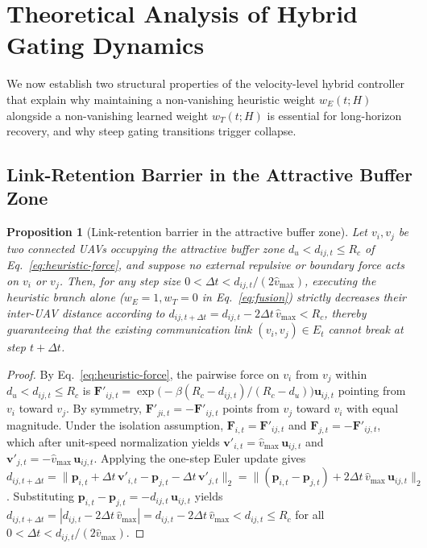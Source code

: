\documentclass[11pt]{article}
\theoremstyle{plain}
\newtheorem{proposition}{Proposition}
\theoremstyle{definition}
\theoremstyle{remark}
\begin{document}
\section{Theoretical Analysis of Hybrid Gating Dynamics}
\label{sec:theory}

We now establish two structural properties of the velocity-level hybrid controller that explain why maintaining a non-vanishing heuristic weight $w_E(t; H)$ alongside a non-vanishing learned weight $w_T(t; H)$ is essential for long-horizon recovery, and why steep gating transitions trigger collapse.

\subsection{Link-Retention Barrier in the Attractive Buffer Zone}
\label{sec:monotonicity}

\begin{proposition}[Link-retention barrier in the attractive buffer zone]
\label{prop:monotonicity}
Let $v_i, v_j$ be two connected UAVs occupying the attractive buffer zone $d_u < d_{ij,t} \le R_c$ of Eq.~\eqref{eq:heuristic-force}, and suppose no external repulsive or boundary force acts on $v_i$ or $v_j$. Then, for any step size $0 < \Delta t < d_{ij,t} / (2\hat{v}_{\max})$, executing the heuristic branch alone ($w_E = 1, w_T = 0$ in Eq.~\eqref{eq:fusion}) strictly decreases their inter-UAV distance according to $d_{ij,t+\Delta t} = d_{ij,t} - 2\Delta t\,\hat{v}_{\max} < R_c$, thereby guaranteeing that the existing communication link $(v_i, v_j) \in E_t$ cannot break at step $t + \Delta t$.
\end{proposition}

\begin{proof}
By Eq.~\eqref{eq:heuristic-force}, the pairwise force on $v_i$ from $v_j$ within $d_u < d_{ij,t} \le R_c$ is $\mathbf{F}'_{ij,t} = \exp\bigl(-\beta (R_c - d_{ij,t})/(R_c-d_u)\bigr) \mathbf{u}_{ij,t}$ pointing from $v_i$ toward $v_j$. By symmetry, $\mathbf{F}'_{ji,t} = -\mathbf{F}'_{ij,t}$ points from $v_j$ toward $v_i$ with equal magnitude. Under the isolation assumption, $\mathbf{F}_{i,t} = \mathbf{F}'_{ij,t}$ and $\mathbf{F}_{j,t} = -\mathbf{F}'_{ij,t}$, which after unit-speed normalization yields $\mathbf{v}'_{i,t} = \hat{v}_{\max}\,\mathbf{u}_{ij,t}$ and $\mathbf{v}'_{j,t} = -\hat{v}_{\max}\,\mathbf{u}_{ij,t}$. Applying the one-step Euler update gives $d_{ij,t+\Delta t} = \|\mathbf{p}_{i,t} + \Delta t\,\mathbf{v}'_{i,t} - \mathbf{p}_{j,t} - \Delta t\,\mathbf{v}'_{j,t}\|_2 = \|(\mathbf{p}_{i,t} - \mathbf{p}_{j,t}) + 2\Delta t\, \hat{v}_{\max}\, \mathbf{u}_{ij,t}\|_2$. Substituting $\mathbf{p}_{i,t}-\mathbf{p}_{j,t} = -d_{ij,t}\,\mathbf{u}_{ij,t}$ yields $d_{ij,t+\Delta t} = |d_{ij,t} - 2\Delta t\, \hat{v}_{\max}| = d_{ij,t} - 2\Delta t\,\hat{v}_{\max} < d_{ij,t} \le R_c$ for all $0 < \Delta t < d_{ij,t}/(2\hat{v}_{\max})$.
\end{proof}
\end{document}
